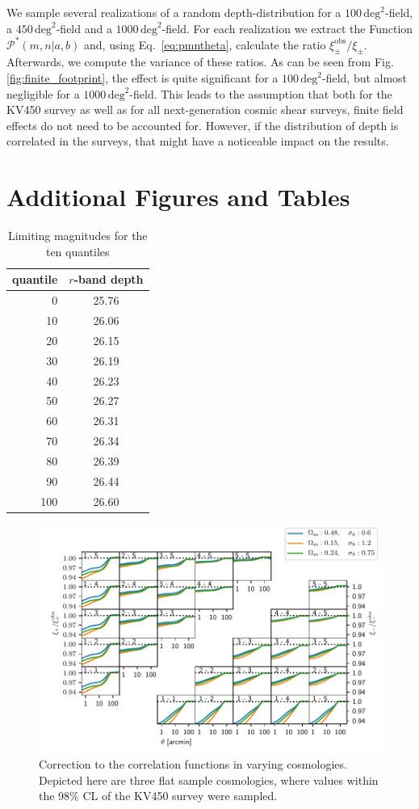 \documentclass{aa}
\renewcommand{\rm}{\mathrm}
\begin{document}
\begin{appendix}
We sample several realizations of a random depth-distribution for a $100\,\rm{deg}^2$-field, a $450\,\rm{deg}^2$-field and a $1000\,\rm{deg}^2$-field. For each realization we extract the Function $\mathcal{P}^*(m,n|a,b)$ and, using Eq.~\eqref{eq:pmntheta}, calculate the ratio $\xi_\pm^{\rm{obs}}/\xi_\pm$. Afterwards, we compute the variance of these ratios. As can be seen from Fig. \ref{fig:finite_footprint}, the effect is quite significant for a $100\,\rm{deg}^2$-field, but almost negligible for a $1000\,\rm{deg}^2$-field. This leads to the assumption that both for the KV450 survey as well as for all next-generation cosmic shear surveys, finite field effects do not need to be accounted for. However, if the distribution of depth is correlated in the surveys, that might have a noticeable impact on the results.

\section{Additional Figures and Tables}
\begin{table}[h]
\centering
\caption{Limiting magnitudes for the ten quantiles}
\label{tab:maglim}
\begin{tabular}{r c}
\hline\hline
quantile & $r$-band depth \\
\hline
0 & 25.76 \\
10 & 26.06 \\
20 & 26.15 \\
30 & 26.19 \\
40 & 26.23 \\
50 & 26.27 \\
60 & 26.31 \\
70 & 26.34 \\
80 & 26.39 \\
90 & 26.44 \\
100 & 26.60 \\
\hline
\end{tabular}
\end{table}
\begin{figure}[h]
\centering
\includegraphics[width=0.9\linewidth]{images/compare_cosmos.pdf}
\caption{Correction to the correlation functions in varying cosmologies. Depicted here are three flat sample cosmologies, where values within the 98\% CL of the KV450 survey were sampled.}
\label{fig:comparecosmo}
\end{figure}
\end{appendix}
\end{document}
